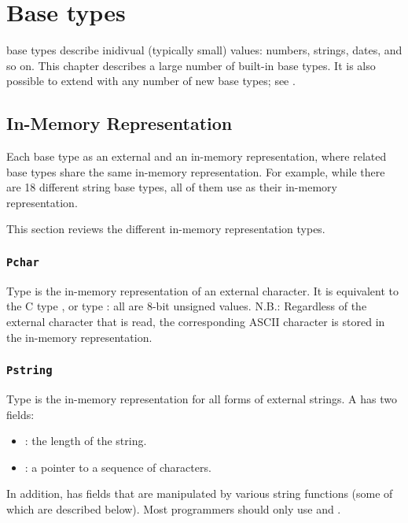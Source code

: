 \chapter{Base types}
\label{chap:base-types}

\PADSL{} base types describe inidivual (typically small) values: numbers, strings, dates, and so on.
This chapter describes a large number of built-in \PADSL{} base types.
It is also possible to extend \PADSL{} with any
number of new base types; see .

\section{In-Memory Representation}
\label{sec:base-types-rep}

Each base type as an external and an in-memory representation, where
related base types share the same in-memory representation.  For
example, while there are 18 different string base types, all of them
use  as their in-memory representation.

This section reviews the different in-memory representation types.

\subsection{{\tt Pchar}}

Type  is the in-memory representation of an external
character.  It is equivalent to the C type , or type
: all are 8-bit unsigned values.  N.B.: Regardless of the
external character that is read, the corresponding ASCII character is stored in 
the in-memory representation.

\subsection{{\tt Pstring}}

Type  is the in-memory representation for all forms of
external strings.  A   has two fields:
\begin{itemize}
\item {} : the length of the string.
\item {} : a pointer to a sequence of  characters.
\end{itemize}
In addition,  has fields that are manipulated
by various string functions (some of which are described below).
Most programmers should only use  and .

